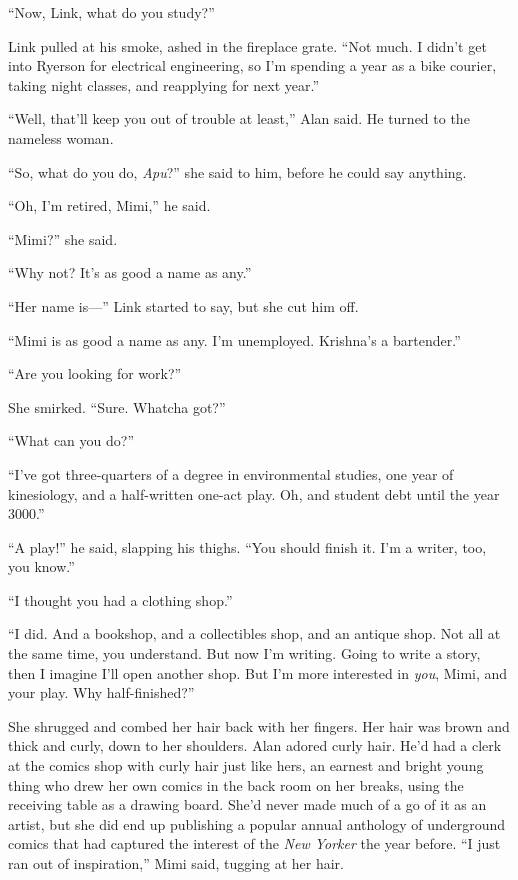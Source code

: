 \documentclass{article}
\begin{document}
``Now, Link, what do you study?''

Link pulled at his smoke, ashed in the fireplace grate.  ``Not much. 
I didn't get into Ryerson for electrical engineering, so I'm spending
a year as a bike courier, taking night classes, and reapplying for
next year.''

``Well, that'll keep you out of trouble at least,'' Alan said.  He
turned to the nameless woman.

``So, what do you do, \textit{Apu}?'' she said to him, before he could
say anything.

``Oh, I'm retired, Mimi,'' he said.

``Mimi?'' she said.

``Why not?  It's as good a name as any.''

``Her name is---'' Link started to say, but she cut him off.

``Mimi is as good a name as any.  I'm unemployed.  Krishna's a
bartender.''

``Are you looking for work?''

She smirked.  ``Sure.  Whatcha got?''

``What can you do?''

``I've got three-quarters of a degree in environmental studies, one
year of kinesiology, and a half-written one-act play.  Oh, and student
debt until the year 3000.''

``A play!'' he said, slapping his thighs.  ``You should finish it. 
I'm a writer, too, you know.''

``I thought you had a clothing shop.''

``I did.  And a bookshop, and a collectibles shop, and an antique
shop.  Not all at the same time, you understand.  But now I'm writing. 
Going to write a story, then I imagine I'll open another shop.  But
I'm more interested in \textit{you}, Mimi, and your play.  Why
half-finished?''

She shrugged and combed her hair back with her fingers.  Her hair was
brown and thick and curly, down to her shoulders.  Alan adored curly
hair.  He'd had a clerk at the comics shop with curly hair just like
hers, an earnest and bright young thing who drew her own comics in the
back room on her breaks, using the receiving table as a drawing board. 
She'd never made much of a go of it as an artist, but she did end up
publishing a popular annual anthology of underground comics that had
captured the interest of the \textit{New Yorker} the year before.  ``I
just ran out of inspiration,'' Mimi said, tugging at her hair.
\end{document}
